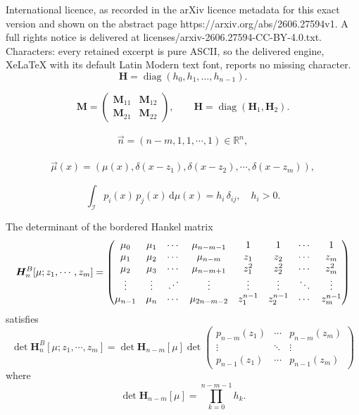 \documentclass[10pt,a4paper]{amsart}
\newcommand{\R}{\mathbb{R}}
\newcommand{\dd}{\mathrm{d}}
\begin{document}
International licence, as recorded in the arXiv licence metadata for this exact version and shown on the abstract page https://arxiv.org/abs/2606.27594v1. A full rights notice is delivered at licenses/arxiv-2606.27594-CC-BY-4.0.txt. Characters: every retained excerpt is pure ASCII, so the delivered engine, XeLaTeX with its default Latin Modern text font, reports no missing character.
\begin{equation} \label{defn of H}
    \bm{H} = \operatorname{diag}(h_0,h_1,\ldots, h_{n-1}).
\end{equation}

\begin{equation} \label{defn of M, H 4 blocks}
\bm{M} =
\begin{pmatrix}
\bm{M}_{11} & \bm{M}_{12} \\
\bm{M}_{21} & \bm{M}_{22}
\end{pmatrix},
\qquad
\bm{H} = \operatorname{diag}(\bm{H}_1,\bm{H}_2).
\end{equation}

\begin{align} \label{app bordered hankel vector}
\vec{n} = (n-m, 1, 1, \cdots, 1) \in \R^n,
\end{align}

\begin{align} \label{app bordered hankel measures}
\vec{\mu}(x) = \left( \mu(x), \delta(x - z_1), \delta(x - z_2),  \cdots, \delta(x - z_m) \right),    
\end{align}

\begin{equation}\label{eq:orthog}
\int_{\mathscr I} p_i(x)\, p_j(x)\,\dd\mu(x)=h_i\,\delta_{ij},\quad h_i>0.
\end{equation}

\begin{proposition} \label{app bordered hankel prop}
The determinant of the bordered Hankel matrix
\begin{align} \label{borderd hankel defn}
\bm H_n^{B}[\mu;z_1,\cdots,z_m] = \begin{pmatrix}
		\mu_0 & \mu_1 & \cdots & \mu_{n-m-1} & 1 & 1 & \cdots & 1 \\
		\mu_1 & \mu_2 & \cdots & \mu_{n-m} & z_1 & z_2 & \cdots & z_m \\
		\mu_2 & \mu_3 & \cdots & \mu_{n-m+1} & z_1^2 & z_2^2 & \cdots & z_m^2 \\
		\vdots & \vdots & \reflectbox{$\ddots$} & \vdots & \vdots & \vdots & \ddots & \vdots  \\
		\mu_{n-1} & \mu_n & \cdots & \mu_{2n-m-2} & z_1^{n-1} & z_2^{n-1} & \cdots & z_{m}^{n-1}\end{pmatrix}
\end{align}
satisfies
\[
\det\bm H_n^{B}[\mu;z_1,\cdots,z_m] = \det \bm{H}_{n-m}[\mu] \det 
\begin{pmatrix}
	p_{n-m}(z_1) & \cdots & p_{n-m}(z_{m}) \\
	\vdots & \ddots & \vdots \\
	p_{n-1}(z_1) & \cdots & p_{n-1}(z_{m})
\end{pmatrix}
\]
where \[\det \bm{H}_{n-m}[\mu] = \prod_{k=0}^{n-m-1} h_k.\]
\end{proposition}
\end{document}
